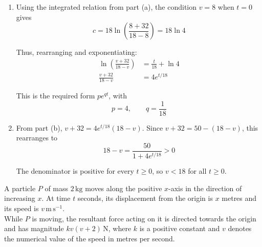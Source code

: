 \documentclass[leqno]{article}
\begin{document}
\begin{enumerate}[
  label=\textbf{\arabic*.},
  leftmargin=*,
  topsep=0pt,
  partopsep=0pt,
  parsep=0pt
]
\begin{djsSolution}
\begin{enumerate}[label=\textbf{(\alph*)}, start=1]
Combining the logarithms:
\[
18\ln\left(\frac{v+32}{18-v}\right)=t+c
\]

Let \(t_3\) and \(t_{13}\) be the times at which the speeds are \(3\) and \(13\,\mathrm{m\,s^{-1}}\), respectively. Substituting these speeds:
\begin{align*}
t_3+c&=18\ln\left(\frac{35}{15}\right)=18\ln\left(\frac73\right)\\
t_{13}+c&=18\ln\left(\frac{45}{5}\right)=18\ln9
\end{align*}

Subtracting eliminates \(c\):
\begin{align*}
T=t_{13}-t_3
&=18\left(\ln9-\ln\left(\frac73\right)\right)\\
&=18\ln\left(\frac{27}{7}\right)
\end{align*}

\item Using the integrated relation from part (a), the condition \(v=8\) when \(t=0\) gives
\[
c=18\ln\left(\frac{8+32}{18-8}\right)=18\ln4
\]

Thus, rearranging and exponentiating:
\begin{align*}
\ln\left(\frac{v+32}{18-v}\right)&=\frac{t}{18}+\ln4\\
\frac{v+32}{18-v}&=4e^{t/18}
\end{align*}

This is the required form \(pe^{qt}\), with
\[
p=4,\qquad q=\frac{1}{18}
\]

\item From part (b), \(v+32=4e^{t/18}(18-v)\). Since \(v+32=50-(18-v)\), this rearranges to
\[
18-v=\frac{50}{1+4e^{t/18}}>0
\]

The denominator is positive for every \(t\geq0\), so \(v<18\) for all \(t\geq0\).
\end{enumerate}
\end{djsSolution}

\newpage

\questionitem

A particle $P$ of mass $2\,\mathrm{kg}$ moves along the positive $x$-axis in the direction of increasing $x$. At time $t$ seconds, its displacement from the origin is $x$ metres and its speed is $v\,\mathrm{m\,s^{-1}}$. \\

While $P$ is moving, the resultant force acting on it is directed towards the origin and has magnitude $kv(v+2)\,\mathrm{N}$, where $k$ is a positive constant and $v$ denotes the numerical value of the speed in metres per second. \\


\end{enumerate}
\end{document}
